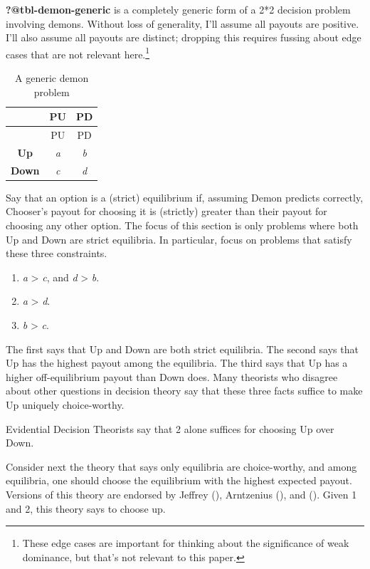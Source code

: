 \documentclass[
  10pt,
  letterpaper,
  DIV=11,
  numbers=noendperiod,
  twoside]{scrartcl}
\providecommand{\tightlist}{%
  \setlength{\itemsep}{0pt}\setlength{\parskip}{0pt}}\usepackage{longtable,booktabs,array}
\begin{document}
\textbf{?@tbl-demon-generic} is a completely generic form of a 2*2
decision problem involving demons. Without loss of generality, I'll
assume all payouts are positive. I'll also assume all payouts are
distinct; dropping this requires fussing about edge cases that are not
relevant here.\footnote{These edge cases are important for thinking
  about the significance of weak dominance, but that's not relevant to
  this paper.}

\begin{longtable}[]{@{}ccc@{}}
\caption{A generic demon
problem}\label{tbl-generic-demon}\tabularnewline
\toprule\noalign{}
& PU & PD \\
\midrule\noalign{}
\endfirsthead
\toprule\noalign{}
& PU & PD \\
\midrule\noalign{}
\endhead
\bottomrule\noalign{}
\endlastfoot
\textbf{Up} & \emph{a} & \emph{b} \\
\textbf{Down} & \emph{c} & \emph{d} \\
\end{longtable}

Say that an option is a (strict) equilibrium if, assuming Demon predicts
correctly, Chooser's payout for choosing it is (strictly) greater than
their payout for choosing any other option. The focus of this section is
only problems where both Up and Down are strict equilibria. In
particular, focus on problems that satisfy these three constraints.

\begin{enumerate}
\def\labelenumi{\arabic{enumi}.}
\tightlist
\item
  \emph{a} \textgreater{} \emph{c}, and \emph{d} \textgreater{}
  \emph{b}.
\item
  \emph{a} \textgreater{} \emph{d}.
\item
  \emph{b} \textgreater{} \emph{c}.
\end{enumerate}

The first says that Up and Down are both strict equilibria. The second
says that Up has the highest payout among the equilibria. The third says
that Up has a higher off-equilibrium payout than Down does. Many
theorists who disagree about other questions in decision theory say that
these three facts suffice to make Up uniquely choice-worthy.

Evidential Decision Theorists say that 2 alone suffices for choosing Up
over Down.

Consider next the theory that says only equilibria are choice-worthy,
and among equilibria, one should choose the equilibrium with the highest
expected payout. Versions of this theory are endorsed by Jeffrey
(), Arntzenius
(), and
(). Given 1 and
2, this theory says to choose up.
\end{document}
